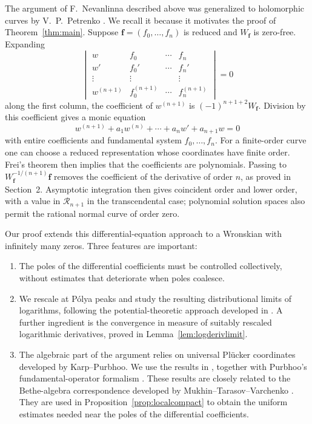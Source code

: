 \documentclass[12pt,letterpaper,reqno]{amsart}
\theoremstyle{definition}
\numberwithin{equation}{section}
\newcommand{\fv}{\bm f}
\begin{document}
The argument of F.~Nevanlinna described above was generalized to
holomorphic curves by V.~P.~Petrenko \cite{Pet84}. We recall it because it
motivates the proof of Theorem~\ref{thm:main}. Suppose
$\fv=(f_0,\ldots,f_{n})$ is reduced and $W_{\fv}$ is zero-free. Expanding
\[
 \begin{vmatrix}
 w&f_0&\cdots&f_{n}\\
 w'&f_0'&\cdots&f_{n}'\\
 \vdots&\vdots&&\vdots\\
 w^{(n+1)}&f_0^{(n+1)}&\cdots&f_{n}^{(n+1)}
 \end{vmatrix}=0
\]
along the first column, the coefficient of $w^{(n+1)}$ is
$(-1)^{{n+1}+2}W_{\fv}$. Division by this coefficient gives a monic equation
\[
 w^{(n+1)}+a_1w^{(n)}+\cdots+a_nw'+a_{n+1}w=0
\]
with entire coefficients and fundamental system $f_0,\ldots,f_{n}$.
For a finite-order curve one can choose a reduced representation whose
coordinates have finite order. Frei's theorem \cite{Fre53} then implies
that the coefficients are polynomials. Passing to
$W_{\fv}^{-1/(n+1)}\fv$ removes the coefficient of the derivative of order
$n$, as proved in Section~2. Asymptotic integration \cite{Was65}
then gives coincident order and lower order, with a value in
$\mathcal R_{n+1}$ in the transcendental case; polynomial solution spaces
also permit the rational normal curve of order zero.

Our proof extends this differential-equation approach to a Wronskian
with infinitely many zeros. Three features are important:
\begin{enumerate}[label=(\arabic*)]
\item
The poles of the differential coefficients must be controlled collectively,
without estimates that deteriorate when poles coalesce.

\item
We rescale at P\'olya peaks and study the resulting distributional limits
of logarithms, following the potential-theoretic approach developed in
\cite{Ere89a,Ere89b,ES91,ES92,Ere93}. A further ingredient is the
convergence in measure of suitably rescaled logarithmic derivatives,
proved in Lemma~\ref{lem:logderivlimit}.

\item
The algebraic part of the argument relies on universal Pl\"ucker
coordinates developed by Karp--Purbhoo. We use the results in \cite{KP26},
together with Purbhoo's fundamental-operator formalism
\cite[Proposition~2.2]{Pur23}. These results are closely related
to the Bethe-algebra correspondence developed by
Mukhin--Tarasov--Varchenko \cite{MTV13}. They are used in
Proposition~\ref{prop:localcompact} to obtain the uniform estimates needed
near the poles of the differential coefficients.
\end{enumerate}
\end{document}
